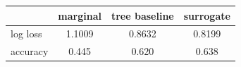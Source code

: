\begin{tabular}{lccc}
\toprule
 & marginal & tree baseline & surrogate \\
\midrule
log loss & 1.1009 & 0.8632 & 0.8199 \\
accuracy & 0.445 & 0.620 & 0.638 \\
\bottomrule
\end{tabular}
